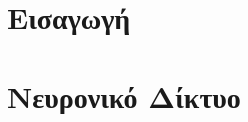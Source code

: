 \documentclass[12pt]{article}
\begin{document}
\maketitle \newpage
{}
\tableofcontents \newpage

\section{Εισαγωγή}


\section{Νευρονικό Δίκτυο}

\end{document}
